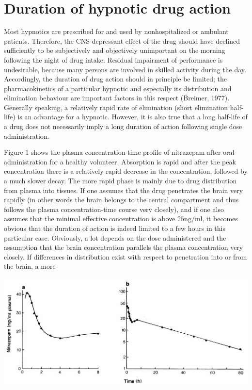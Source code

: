 \documentclass[10pt]{article}
\begin{document}
\section*{Duration of hypnotic drug action}
Most hypnotics are prescribed for and used by nonhospitalized or ambulant patients. Therefore, the CNS-depressant effect of the drug should have declined sufficiently to be subjectively and objectively unimportant on the morning following the night of drug intake. Residual impairment of performance is undesirable, because many persons are involved in skilled activity during the day. Accordingly, the duration of drug action should in principle be limited; the pharmacokinetics of a particular hypnotic and especially its distribution and elimination behaviour are important factors in this respect (Breimer, 1977). Generally speaking, a relatively rapid rate of elimination (short elimination half-life) is an advantage for a hypnotic. However, it is also true that a long half-life of a drug does not necessarily imply a long duration of action following single dose administration.

Figure 1 shows the plasma concentration-time profile of nitrazepam after oral administration for a healthy volunteer. Absorption is rapid and after the peak concentration there is a relatively rapid decrease in the concentration, followed by a much slower decay. The more rapid phase is mainly due to drug distribution from plasma into tissues. If one assumes that the drug penetrates the brain very rapidly (in other words the brain belongs to the central compartment and thus follows the plasma concentration-time course very closely), and if one also assumes that the minimal effective concentration is above $25 \mathrm{ng} / \mathrm{ml}$, it becomes obvious that the duration of action is indeed limited to a few hours in this particular case. Obviously, a lot depends on the dose administered and the assumption that the brain concentration parallels the plasma concentration very closely. If differences in distribution exist with respect to penetration into or from the brain, a more

\begin{center}
\includegraphics[max width=\textwidth]{2024_06_20_8ae6f73ba2f120e73ed4g-2}
\end{center}
\end{document}
